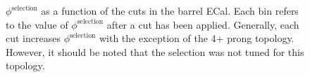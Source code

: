 \begin{figure}
\begin{minipage}{.5\linewidth}
\centering
{}
\end{minipage}\par\medskip
\caption{$\phi^{\textrm{selection}}$ as a function of the cuts in the barrel ECal.  Each bin refers to the value of $\phi^{\textrm{selection}}$ after a cut has been applied.  Generally, each cut increases $\phi^{\textrm{selection}}$ with the exception of the 4+ prong topology.  However, it should be noted that the selection was not tuned for this topology.}
\label{fig:SelFOMCutLevelBarrel}
\end{figure}
